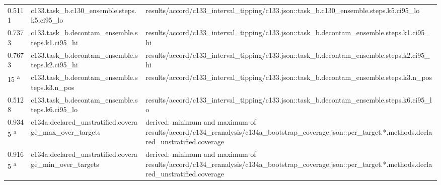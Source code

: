 \begin{longtable}{@{}p{0.7in}p{1.9in}p{2.6in}@{}}
0.5111 & c133.\allowbreak{}task\_b.\allowbreak{}c130\_ensemble.\allowbreak{}steps.\allowbreak{}k5.\allowbreak{}ci95\_lo & results/\allowbreak{}accord/\allowbreak{}c133\_interval\_tipping/\allowbreak{}c133.\allowbreak{}json::task\_b.\allowbreak{}c130\_ensemble.\allowbreak{}steps.\allowbreak{}k5.\allowbreak{}ci95\_lo\\
0.7373 & c133.\allowbreak{}task\_b.\allowbreak{}decontam\_ensemble.\allowbreak{}steps.\allowbreak{}k1.\allowbreak{}ci95\_hi & results/\allowbreak{}accord/\allowbreak{}c133\_interval\_tipping/\allowbreak{}c133.\allowbreak{}json::task\_b.\allowbreak{}decontam\_ensemble.\allowbreak{}steps.\allowbreak{}k1.\allowbreak{}ci95\_hi\\
0.7673 & c133.\allowbreak{}task\_b.\allowbreak{}decontam\_ensemble.\allowbreak{}steps.\allowbreak{}k2.\allowbreak{}ci95\_hi & results/\allowbreak{}accord/\allowbreak{}c133\_interval\_tipping/\allowbreak{}c133.\allowbreak{}json::task\_b.\allowbreak{}decontam\_ensemble.\allowbreak{}steps.\allowbreak{}k2.\allowbreak{}ci95\_hi\\
15 \textsuperscript{a} & c133.\allowbreak{}task\_b.\allowbreak{}decontam\_ensemble.\allowbreak{}steps.\allowbreak{}k3.\allowbreak{}n\_pos & results/\allowbreak{}accord/\allowbreak{}c133\_interval\_tipping/\allowbreak{}c133.\allowbreak{}json::task\_b.\allowbreak{}decontam\_ensemble.\allowbreak{}steps.\allowbreak{}k3.\allowbreak{}n\_pos\\
0.5128 & c133.\allowbreak{}task\_b.\allowbreak{}decontam\_ensemble.\allowbreak{}steps.\allowbreak{}k6.\allowbreak{}ci95\_lo & results/\allowbreak{}accord/\allowbreak{}c133\_interval\_tipping/\allowbreak{}c133.\allowbreak{}json::task\_b.\allowbreak{}decontam\_ensemble.\allowbreak{}steps.\allowbreak{}k6.\allowbreak{}ci95\_lo\\
0.9345 \textsuperscript{a} & c134a.\allowbreak{}declared\_unstratified.\allowbreak{}coverage\_max\_over\_targets & derived: minimum and maximum of results/\allowbreak{}accord/\allowbreak{}c134\_reanalysis/\allowbreak{}c134a\_bootstrap\_coverage.\allowbreak{}json::per\_target.\allowbreak{}*.\allowbreak{}methods.\allowbreak{}declared\_unstratified.\allowbreak{}coverage\\
0.9165 \textsuperscript{a} & c134a.\allowbreak{}declared\_unstratified.\allowbreak{}coverage\_min\_over\_targets & derived: minimum and maximum of results/\allowbreak{}accord/\allowbreak{}c134\_reanalysis/\allowbreak{}c134a\_bootstrap\_coverage.\allowbreak{}json::per\_target.\allowbreak{}*.\allowbreak{}methods.\allowbreak{}declared\_unstratified.\allowbreak{}coverage\\

\end{longtable}
